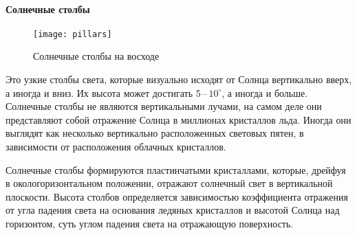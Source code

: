 \paragraph{Солнечные столбы}

\begin{wrapfigure}[10]{r}{0.3\tw} 
    \vspace{-1pc}
    \centering
    \texttt{[image: pillars]}
    \caption{Солнечные столбы на восходе}
    \label{pic:pillars}
\end{wrapfigure}
Это узкие столбы света, которые визуально исходят от Солнца вертикально вверх, а иногда и вниз. Их высота может достигать 5\,--\,$10^\circ$, а иногда и больше. Солнечные столбы не являются вертикальными лучами, на самом деле они представляют собой отражение Солнца в миллионах кристаллов льда. Иногда они выглядят как несколько вертикально расположенных световых пятен, в зависимости от расположения облачных кристаллов.

Солнечные столбы формируются пластинчатыми кристаллами, которые, дрейфуя в окологоризонтальном положении, отражают солнечный свет в вертикальной плоскости. Высота столбов определяется зависимостью коэффициента отражения от угла падения света на основания ледяных кристаллов и высотой Солнца над горизонтом, суть углом падения света на отражающую поверхность.


